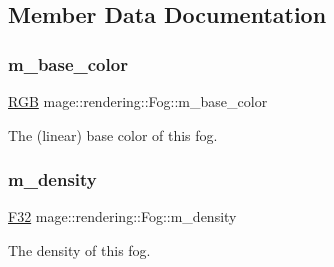 \subsection{Member Data Documentation}
\hypertarget{classmage_1_1rendering_1_1_fog_a5f7d0bcb79a1d68b2456bd005db48a99}{}\label{classmage_1_1rendering_1_1_fog_a5f7d0bcb79a1d68b2456bd005db48a99} 
\subsubsection{\texorpdfstring{m\+\_\+base\+\_\+color}{m\_base\_color}}
{\footnotesize\ttfamily \hyperlink{structmage_1_1_r_g_b}{R\+GB} mage\+::rendering\+::\+Fog\+::m\+\_\+base\+\_\+color\hspace{0.3cm}{\ttfamily [private]}}

The (linear) base color of this fog. \hypertarget{classmage_1_1rendering_1_1_fog_aa7a402ad9eef0e9916bb9f83751ebe32}{}\label{classmage_1_1rendering_1_1_fog_aa7a402ad9eef0e9916bb9f83751ebe32} 
\subsubsection{\texorpdfstring{m\+\_\+density}{m\_density}}
{\footnotesize\ttfamily \hyperlink{namespacemage_aa97e833b45f06d60a0a9c4fc22ae02c0}{F32} mage\+::rendering\+::\+Fog\+::m\+\_\+density\hspace{0.3cm}{\ttfamily [private]}}

The density of this fog. 